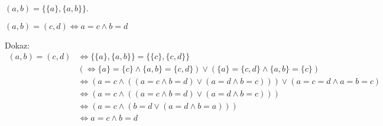 \begin{definicija}
    $(a, b) = \{\{a\},\{a,b\}\}$.
\end{definicija}

\begin{trditev}
    $(a, b) = (c, d) \iff a = c \wedge b = d$
\end{trditev}
Dokaz:
\begin{align*}
    (a, b) = (c, d) &\iff \{\{a\},\{a,b\}\} = \{\{c\},\{c,d\}\} \\
    &(\iff \{a\} = \{c\} \wedge \{a,b\} = \{c,d\}) \vee (\{a\} = \{c,d\} \wedge \{a,b\} = \{c\}) \\
    &\iff (a = c \wedge ((a = c \wedge b = d) \vee (a = d \wedge b = c))) \vee (a = c = d \wedge a = b = c) \\
    &\iff (a = c \wedge ((a = c \wedge b = d) \vee (a = d \wedge b = c))) \\
    &\iff (a = c \wedge (b = d \vee (a = d \wedge b = a))) \\
    &\iff a = c \wedge b = d
\end{align*}

